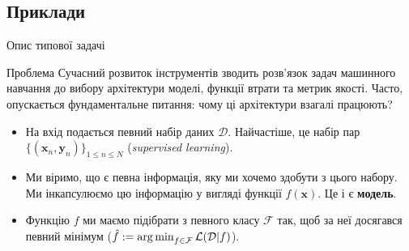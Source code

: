 \documentclass{zkdl-presentation-template}
\begin{document}



    \subsection{Приклади}
    \begin{frame}{Опис типової задачі}
        \begin{alertblock}{Проблема}
            Сучасний розвиток інструментів зводить розв'язок задач машинного
            навчання до вибору архітектури моделі, функції втрати та метрик
            якості. Часто, опускається фундаментальне питання: чому ці
            архітектури взагалі працюють?\pause
        \end{alertblock}

        \begin{itemize}
            \item На вхід подається певний набір даних $\mathcal{D}$.
            Найчастіше, це набір пар $\{(\boldsymbol{x}_n,\boldsymbol{y}_n)\}_{1
            \leq n \leq N}$ (\textit{supervised learning}).\pause
            \item Ми віримо, що є певна інформація, яку ми хочемо здобути з цього набору. Ми інкапсулюємо цю інформацію у вигляді функції $f(\boldsymbol{x})$. Це і є \textbf{модель}.\pause
            \item Функцію $f$ ми маємо підібрати з певного класу $\mathcal{F}$ так, щоб за неї досягався певний мінімум ($\hat{f} := \operatorname*{arg\,min}_{f \in \mathcal{F}}\mathcal{L}(\mathcal{D}|f)$).
        \end{itemize}
    \end{frame}
\end{document}
